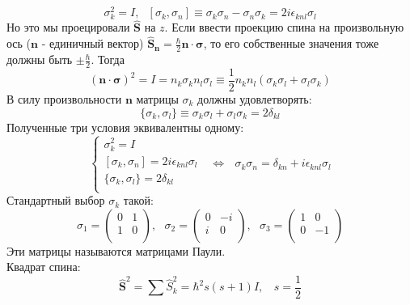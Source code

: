 	$$
		\sigma^2_k = I,  \ \ \ [\sigma_k, \sigma_n] \equiv \sigma_k\sigma_n-\sigma_n\sigma_k = 2i\epsilon_{knl}\sigma_l
	$$
	Но это мы проецировали $\hat{\textbf{S}}$ на $z$. Если ввести проекцию спина на произвольную ось ($\textbf{n}$ - единичный вектор) $\hat{\textbf{S}}_{\textbf{n}} = \frac{\hbar}{2}\textbf{n}\cdot\bm{\sigma}$, то его собственные значения тоже должны быть $\pm\frac{\hbar}{2}$. Тогда 
	$$
		(\textbf{n}\cdot\bm{\sigma})^2 = I = n_k\sigma_k n_l\sigma_l \equiv \frac{1}{2}n_k n_l(\sigma_k\sigma_l + \sigma_l\sigma_k)
	$$
	В силу произвольности $\textbf{n}$ матрицы $\sigma_k$ должны удовлетворять:
	$$
		\{\sigma_k,\sigma_l\} \equiv \sigma_k\sigma_l + \sigma_l\sigma_k = 2\delta_{kl}
	$$
	Полученные три условия эквивалентны одному:
	$$
		\left\{
			\begin{array}{l}
				\sigma^2_k = I\\
				\left[\sigma_k, \sigma_n\right] = 2i\epsilon_{knl}\sigma_l\\
				\{\sigma_k,\sigma_l\} = 2\delta_{kl}\\
			\end{array}
		\right.
		 \ \ \ \Leftrightarrow  \ \ \ \sigma_k\sigma_n = \delta_{kn} + i\epsilon_{knl}\sigma_l
	$$
	Стандартный выбор $\sigma_k$ такой:
	$$
		\sigma_1 = \left( 
		\begin{array}{cc}
			0 & 1\\
			1 & 0\\
		\end{array} 
		\right), \ \ \ 
		\sigma_2 = \left( 
		\begin{array}{cc}
		0 & -i\\
		i & 0\\
		\end{array} 
		\right), \ \ \
		\sigma_3 = \left( 
		\begin{array}{cc}
		1 & 0\\
		0 & -1\\
		\end{array} 
		\right)
	$$
	Эти матрицы называются матрицами Паули. \\
	Квадрат спина:
	$$
		\hat{\textbf{S}}^2 = \sum\hat{S}_k^2 = \hbar^2 s(s+1) I, \ \ \ \ s = \frac{1}{2}
	$$
